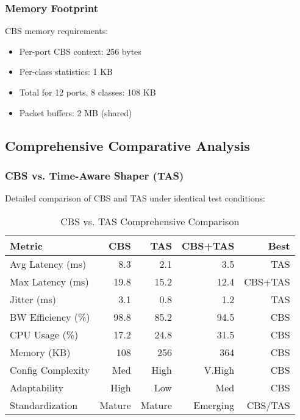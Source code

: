 \documentclass[10pt, journal, compsoc]{IEEEtran}
\begin{document}
\subsubsection{Memory Footprint}

CBS memory requirements:

\begin{itemize}
    \item Per-port CBS context: 256 bytes
    \item Per-class statistics: 1 KB
    \item Total for 12 ports, 8 classes: 108 KB
    \item Packet buffers: 2 MB (shared)
\end{itemize}

\subsection{Comprehensive Comparative Analysis}

\subsubsection{CBS vs. Time-Aware Shaper (TAS)}

Detailed comparison of CBS and TAS under identical test conditions:

\begin{table}[h]
\centering
\caption{CBS vs. TAS Comprehensive Comparison}
\label{tab:cbs_tas_comparison}
\begin{tabular}{lrrrr}
\toprule
\textbf{Metric} & \textbf{CBS} & \textbf{TAS} & \textbf{CBS+TAS} & \textbf{Best} \\
\midrule
Avg Latency (ms) & 8.3 & 2.1 & 3.5 & TAS \\
Max Latency (ms) & 19.8 & 15.2 & 12.4 & CBS+TAS \\
Jitter (ms) & 3.1 & 0.8 & 1.2 & TAS \\
BW Efficiency (\%) & 98.8 & 85.2 & 94.5 & CBS \\
CPU Usage (\%) & 17.2 & 24.8 & 31.5 & CBS \\
Memory (KB) & 108 & 256 & 364 & CBS \\
Config Complexity & Med & High & V.High & CBS \\
Adaptability & High & Low & Med & CBS \\
Standardization & Mature & Mature & Emerging & CBS/TAS \\
\bottomrule
\end{tabular}
\end{table}
\end{document}
